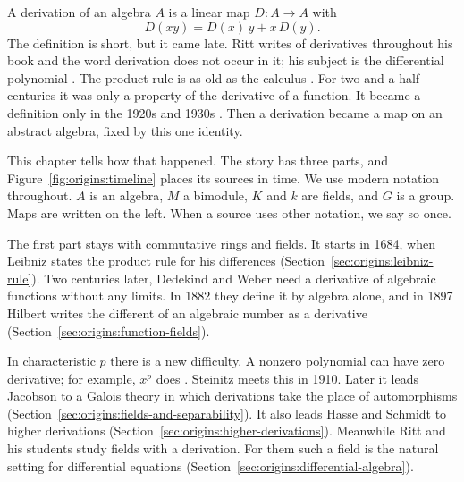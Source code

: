 
A derivation of an algebra $A$ is a linear map $D\colon A \to A$ with
\[
  D(xy) = D(x)\,y + x\,D(y).
\]
The definition is short, but it came late. Ritt writes of derivatives throughout
his book and the word derivation does not occur in it; his subject is the
differential polynomial \cite[p.~1]{Ritt1950}. The
product rule
is as old as the calculus \cite{Leibniz1684}. For two and a half centuries it was
only a property of the derivative of a function. It became a definition only in
the 1920s and
1930s \cite[p.~206]{Jacobson1937}. Then a derivation became a map on an
abstract algebra, fixed by this one identity.

This chapter tells how that happened. The story has three parts, and
Figure~\ref{fig:origins:timeline} places its sources in time. We use modern
notation throughout. $A$ is an algebra, $M$ a bimodule, $K$ and $k$ are
fields, and $G$ is a group. Maps are written on the left. When a source uses
other notation, we say so once.


The first part stays with commutative rings and fields. It starts in 1684,
when Leibniz states the product rule for his differences
(Section~\ref{sec:origins:leibniz-rule}). Two centuries later, Dedekind and
Weber need a derivative of algebraic functions without any limits. In 1882
they define it by algebra alone, and in 1897 Hilbert writes the different of
an algebraic number as a derivative
(Section~\ref{sec:origins:function-fields}).

In characteristic $p$ there is a new difficulty. A nonzero polynomial can have
zero derivative; for example, $x^p$ does \cite[\S 9, p.~213]{Steinitz1910}.
Steinitz meets this in 1910. Later it leads Jacobson to a Galois theory in
which derivations take the place of automorphisms
(Section~\ref{sec:origins:fields-and-separability}). It also leads Hasse and
Schmidt to higher derivations (Section~\ref{sec:origins:higher-derivations}).
Meanwhile Ritt and his students study fields with a derivation. For them such
a field is the natural setting for differential equations
(Section~\ref{sec:origins:differential-algebra}).

